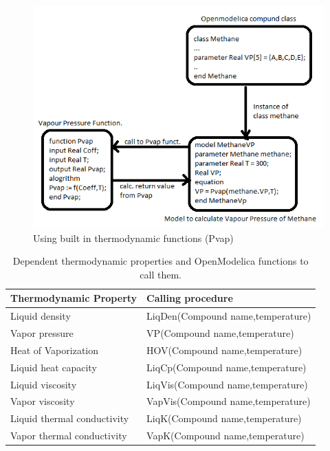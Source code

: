 \documentclass[12pt]{report}
\begin{document}
\begin{figure}
\centering
\includegraphics[width=0.8\linewidth]{BT2}
\caption{Using built in thermodynamic functions (Pvap)}
\label{fig:BT2}
\end{figure}

\begin{table}
\centering
\caption {Dependent thermodynamic properties and OpenModelica functions to call them.}
\label{tab:depprop}
\vspace{1ex}
\begin{tabular}{l|l} \hline
Thermodynamic Property & Calling procedure \\ \hline
Liquid density & LiqDen(Compound name,temperature) \\
Vapor pressure & VP(Compound name,temperature) \\
Heat of Vaporization & HOV(Compound name,temperature) \\
Liquid heat capacity & LiqCp(Compound name,temperature) \\
Liquid viscosity & LiqVis(Compound name,temperature) \\
Vapor viscosity & VapVis(Compound name,temperature) \\
Liquid thermal conductivity & LiqK(Compound name,temperature) \\
Vapor thermal conductivity & VapK(Compound name,temperature) \\ \hline
\end{tabular}
\end{table}
\end{document}
